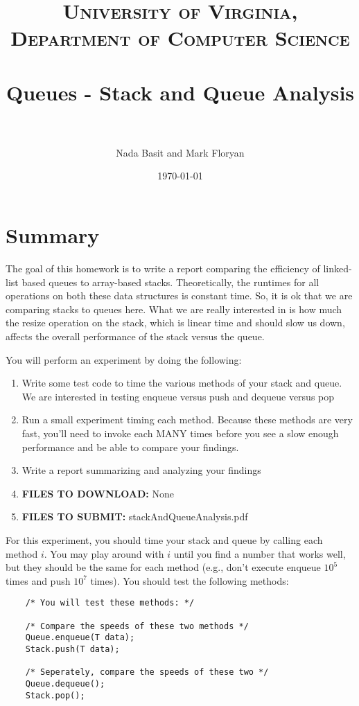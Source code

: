 \documentclass[paper=a4, fontsize=11pt, parskip=full]{scrartcl} %
\title{
\normalfont \normalsize
\textsc{University of Virginia, Department of Computer Science} \\ [25pt] %
\horrule{0.5pt} \\[0.4cm] %
\huge Queues - Stack and Queue Analysis \\ %
\horrule{2pt} \\[0.5cm] %
}
\author{Nada Basit and Mark Floryan}
\date{\normalsize\today} %
\numberwithin{equation}{section} %
\numberwithin{figure}{section} %
\numberwithin{table}{section} %
\begin{document}
\maketitle %


\section{Summary}

The goal of this homework is to write a report comparing the efficiency of linked-list based queues to array-based stacks. Theoretically, the runtimes for all operations on both these data structures is constant time. So, it is ok that we are comparing stacks to queues here. What we are really interested in is how much the resize operation on the stack, which is linear time and should slow us down, affects the overall performance of the stack versus the queue.

You will perform an experiment by doing the following:

\begin{enumerate}
	\item Write some test code to time the various methods of your stack and queue. We are interested in testing enqueue versus push and dequeue versus pop
	\item Run a small experiment timing each method. Because these methods are very fast, you'll need to invoke each MANY times before you see a slow enough performance and be able to compare your findings.
	\item Write a report summarizing and analyzing your findings
	\item \textbf{FILES TO DOWNLOAD:} None
	\item \textbf{FILES TO SUBMIT:} stackAndQueueAnalysis.pdf
\end{enumerate}

For this experiment, you should time your stack and queue by calling each method $i$. You may play around with $i$ until you find a number that works well, but they should be the same for each method (e.g., don't execute enqueue $10^5$ times and push $10^7$ times). You should test the following methods:

\begin{lstlisting}
	/* You will test these methods: */

	/* Compare the speeds of these two methods */
	Queue.enqueue(T data);
	Stack.push(T data);

	/* Seperately, compare the speeds of these two */
	Queue.dequeue();
	Stack.pop();
\end{lstlisting}
\end{document}
